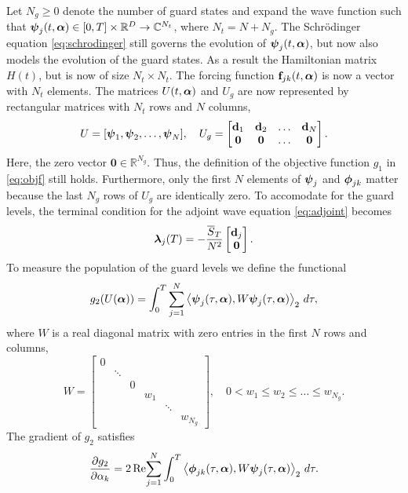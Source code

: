 \documentclass[11pt]{article}
\begin{document}
Let $N_g\geq 0$ denote the number of guard states and expand the wave
function such that $\boldsymbol{\psi}_j(t,\boldsymbol{\alpha})\in [0, T]\times \mathbb{R}^D \to \mathbb{C}^{N_t}$, where
$N_{t} = N + N_g$. The Schr\"odinger equation \eqref{eq:schrodinger} still governs the evolution of
$\boldsymbol{\psi}_j(t,\boldsymbol{\alpha})$, but now also models the evolution of the guard states. As a result the
Hamiltonian matrix $H(t)$, but is now of size $N_t\times N_t$. The forcing function ${\mathbf f}_{jk}(t,\boldsymbol{\alpha})$
is now a vector with $N_t$ elements. The matrices $U(t,\boldsymbol{\alpha})$ and $U_g$ are now represented by
rectangular matrices with $N_t$ rows and $N$
columns,
\[
U = [ \boldsymbol{\psi}_1, \boldsymbol{\psi}_2, \ldots, \boldsymbol{\psi}_N ],\quad 
U_g = \begin{bmatrix}
{\mathbf d}_1 & {\mathbf d}_2 & \ldots & {\mathbf d}_N \\
\boldsymbol{0} & \boldsymbol{0} & \ldots & \boldsymbol{0}
  \end{bmatrix}.
\]
Here, the zero vector $\boldsymbol{0} \in \mathbb{R}^{N_g}$. Thus, the definition of the objective
function $g_1$ in \eqref{eq:objf} still holds. Furthermore, only the first $N$ elements of $\boldsymbol{\psi}_j$
and $\boldsymbol{\phi}_{jk}$ matter because the last $N_g$ rows of $U_g$ are identically zero. To accomodate for
the guard levels, the terminal condition for the adjoint wave equation \eqref{eq:adjoint} becomes
\begin{equation}\label{eq:adjointtc}
\boldsymbol{\lambda}_j(T) = -\frac{\overline{S}_T}{N^2} \begin{bmatrix}
  {\mathbf d}_j \\
  \boldsymbol{0}
  \end{bmatrix}.
\end{equation}
%
To measure the population of the guard levels we define the functional
\begin{equation}\label{eq:g2}
  g_2(U(\boldsymbol{\alpha})) =\int_0^T \sum_{j=1}^N \left\langle \boldsymbol{\psi}_j(\tau,\boldsymbol{\alpha}), W\boldsymbol{\psi}_j(\tau,\boldsymbol{\alpha})
  \right\rangle_2\, d\tau,
\end{equation}
where $W$ is a real diagonal matrix with zero entries in the first $N$ rows and columns,
\[
W = \begin{bmatrix}
  0 &&&&& \\
  & \ddots &&&& \\
  && 0 &&& \\
  &&& w_1 && \\
  &&&& \ddots & \\
  &&&&& w_{N_g}
\end{bmatrix},\quad 0 < w_1 \leq w_2 \leq \ldots \leq w_{N_g}.
\]
The gradient of $g_2$ satisfies
\[
\frac{\partial g_2}{\partial \alpha_k} = 2\,{\rm Re}\! \sum_{j=1}^N  \int_0^T \left\langle \boldsymbol{\phi}_{jk}(\tau,\boldsymbol{\alpha}), W\boldsymbol{\psi}_j(\tau,\boldsymbol{\alpha})
\right\rangle_2\, d\tau.
\]
\end{document}
